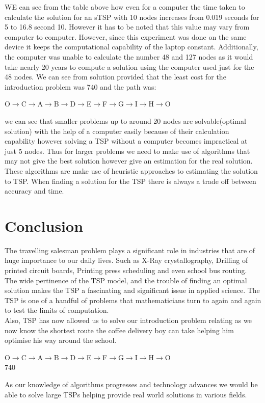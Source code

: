 \documentclass[a4paper]{article}
\begin{document}
WE can see from the table above how even for a computer the time taken to calculate the solution for an sTSP with 10 nodes increases from 0.019 seconds for 5 to 16.8 second 10. However it has to be noted that this value may vary from computer to computer. However, since this experiment was done on the same device it keeps the computational capability of the laptop constant. Additionally, the computer was unable to calculate the number 48 and 127 nodes as it would take nearly 20 years to compute a solution using the computer used just for the 48 nodes. We can see from solution provided that the least cost for the introduction problem was 740 and the path was: 
\begin{center}
     O$\to$C$\to$A$\to$B$\to$D$\to$E$\to$F$\to$G$\to$I$\to$H$\to$O
\end{center}
we can see that smaller problems up to around 20 nodes are solvable(optimal solution) with the help of a computer easily because of their calculation capability however solving a TSP without a computer becomes impractical at just 5 nodes. Thus for larger problems we need to make use of algorithms that may not give the best solution however give an estimation for the real solution. These algorithms are make use of heuristic approaches to estimating the solution to TSP. When finding a solution for the TSP there is always a trade off between accuracy and time.

\section{Conclusion}
The travelling salesman problem plays a significant role in industries that are of huge importance to our daily lives. Such as X-Ray crystallography, Drilling of printed circuit boards, Printing press scheduling and even school bus routing. The wide pertinence of the TSP model,  and the trouble of finding an optimal solution makes the TSP a fascinating and significant issue in applied science. The TSP is one of a handful of  problems that mathematicians turn to again and again to test the limits of computation.\\
Also, TSP has now allowed us to solve our introduction problem relating as we now know the shortest route the coffee delivery boy can take helping him optimise his way around the school.\\
\begin{center}
     O$\to$C$\to$A$\to$B$\to$D$\to$E$\to$F$\to$G$\to$I$\to$H$\to$O\\
     740
\end{center}
As our knowledge of algorithms progresses and technology advances we would be able to solve large TSPs helping provide real world solutions in various fields.
\newpage

\printbibliography
\end{document}
